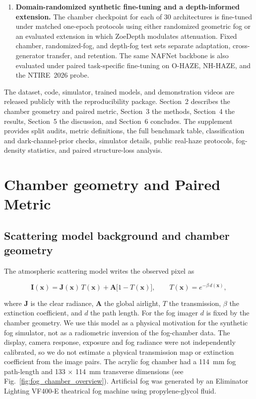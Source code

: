 \documentclass{optica-article}
\begin{document}
\begin{enumerate}
\item \textbf{Domain-randomized synthetic fine-tuning and a
depth-informed extension.} The chamber checkpoint for each of 30
architectures is fine-tuned under matched one-epoch protocols using
either randomized geometric fog or an evaluated extension in which
ZoeDepth modulates attenuation. Fixed chamber, randomized-fog, and
depth-fog test sets separate adaptation, cross-generator transfer, and
retention. The same NAFNet backbone is also evaluated under paired
task-specific fine-tuning on O-HAZE, NH-HAZE, and the NTIRE~2026 probe.

\end{enumerate}
 
The dataset, code, simulator, trained models, and demonstration videos are released
publicly with the reproducibility package. Section~2 describes the chamber geometry and paired metric,
Section~3 the methods, Section~4 the results, Section~5 the
discussion, and Section~6 concludes. The supplement provides split audits, metric definitions, the full benchmark table, classification and dark-channel-prior checks, simulator details, public real-haze protocols, fog-density statistics, and paired structure-loss analysis.

\section{Chamber geometry and Paired Metric}
\label{sec:fogphysics}
 
\subsection{Scattering model background and chamber geometry}
 
The atmospheric scattering model \cite{narasimhan2002vision} writes
the observed pixel as
 
\begin{equation}
  \mathbf{I}(\mathbf{x}) =
    \mathbf{J}(\mathbf{x})\,T(\mathbf{x})
    + \mathbf{A}\bigl[1 - T(\mathbf{x})\bigr],
  \qquad
  T(\mathbf{x}) = e^{-\beta\, d(\mathbf{x})},
  \label{eq:scattering}
\end{equation}
 
\noindent where $\mathbf{J}$ is the clear radiance, $\mathbf{A}$ the
global airlight, $T$ the transmission, $\beta$ the extinction
coefficient, and $d$ the path length. For the fog imager $d$ is
fixed by the chamber geometry. We use this model as a physical motivation for the synthetic fog simulator, not as a radiometric inversion of the fog-chamber data. The display, camera response, exposure and fog radiance were not independently calibrated, so we do not estimate a physical transmission map or extinction coefficient from the image pairs. The acrylic fog chamber had a 114~mm fog path-length and 133 $\times$ 114~mm transverse dimensions (see Fig.~\ref{fig:fog_chamber_overview}). Artificial
fog was generated by an Eliminator Lighting VF400-E theatrical fog
machine using propylene-glycol fluid.
 
\end{document}
